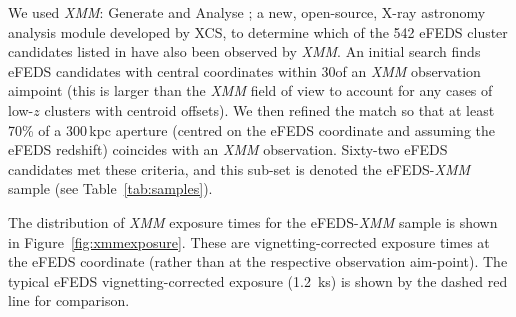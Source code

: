 \documentclass[fleqn,usenatbib]{mnras}
\begin{document}
We used {\em XMM}: Generate and Analyse \citep[\texttt{XGA}\footnote{\href{https://github.com/DavidT3/XGA}{{\em XMM}: Generate and Analyse GitHub}}][]{xgapaper}; a new, open-source, X-ray astronomy analysis module developed by XCS, to determine which of the 542 eFEDS cluster candidates listed in \cite{efedsclustercat} have also been observed by {\em XMM}.
An initial search finds eFEDS candidates with central coordinates within 30\arcmin of an {\em XMM} observation aimpoint (this is larger than the {\em XMM} field of view to account for any cases of low-$z$ clusters with centroid offsets). We then refined the match so that at least 70\% of a 300\,kpc aperture (centred on the eFEDS coordinate and assuming the eFEDS redshift) coincides with an {\em XMM} observation. Sixty-two eFEDS candidates met these criteria, and this sub-set is denoted the eFEDS-{\em XMM} sample (see Table~\ref{tab:samples}).


The distribution of {\em XMM} exposure times for the eFEDS-{\em XMM} sample is shown in Figure~\ref{fig:xmmexposure}. These are vignetting-corrected exposure times at the eFEDS coordinate (rather than at the respective observation aim-point). The typical eFEDS vignetting-corrected exposure (1.2~ks) is shown by the dashed red line for comparison.

\end{document}

